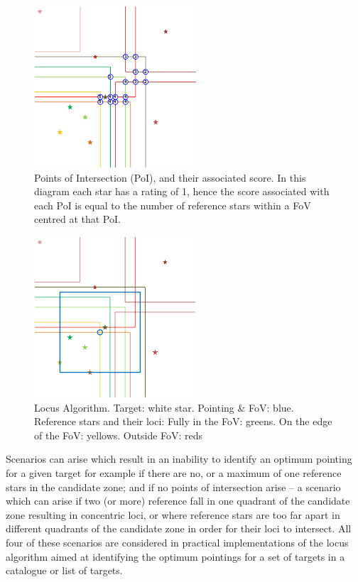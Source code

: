 \documentclass[]{elsarticle} %
\makeatletter
\def\maxwidth{\ifdim\Gin@nat@width>\linewidth\linewidth
\else\Gin@nat@width\fi}
\let\Oldincludegraphics\includegraphics
\renewcommand{\includegraphics}[1]{\Oldincludegraphics[width=\maxwidth]{#1}}
\makeatother
\begin{document}
\begin{figure}
\centering
\includegraphics{fig4.png}
\caption{Points of Intersection (PoI), and their associated
score. In this diagram each star has a rating of 1, hence the score
associated with each PoI is equal to the number of reference stars
within a FoV centred at that PoI.}
\end{figure}

\begin{figure}
\centering
\includegraphics{fig5.png}
\caption{Locus Algorithm. Target: white star. Pointing \& FoV:
blue. Reference stars and their loci: Fully in the FoV: greens. On the
edge of the FoV: yellows. Outside FoV: reds}
\end{figure}

Scenarios can arise which result in an inability to identify an optimum
pointing for a given target for example if there are no, or a maximum of
one reference stars in the candidate zone; and if no points of
intersection arise -- a scenario which can arise if two (or more)
reference fall in one quadrant of the candidate zone resulting in
concentric loci, or where reference stars are too far apart in different
quadrants of the candidate zone in order for their loci to intersect.
All four of these scenarios are considered in practical implementations
of the locus algorithm aimed at identifying the optimum pointings for a
set of targets in a catalogue or list of targets.
\end{document}
